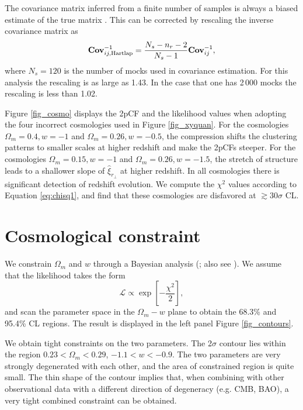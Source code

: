 \documentclass[iop]{emulateapj}
\begin{document}
The covariance matrix inferred from a finite number of samples
is always a biased estimate of the true matrix \citep{Hartlap}.
This can be corrected by rescaling the inverse covariance matrix as 
\begin{equation}
 {\bf Cov}^{-1}_{ij,\rm Hartlap} = \frac{N_s - n_{r}-2}{N_s-1} {\bf Cov}^{-1}_{ij},
\end{equation}
where $N_s=120$ is the number of mocks used in covariance estimation.
For this analysis the rescaling is as large as 1.43.
In the case that one has 2\,000 mocks the rescaling is less than 1.02.




Figure \ref{fig_cosmo} displays the 2pCF and the likelihood values when adopting 
the four incorrect cosmologies used in Figure \ref{fig_xyquan}.
For the cosmologies $\Omega_m=0.4,w=-1$ and $\Omega_m=0.26,w=-0.5$,
the compression shifts the clustering patterns to smaller scales
at higher redshift and make the 2pCFs steeper.
For the cosmologies $\Omega_m=0.15,w=-1$ and $\Omega_m=0.26,w=-1.5$,
the stretch of structure leads to a shallower slope of $\hat{\xi}_{r_\perp}$ at higher redshift.
In all cosmologies there is significant detection of redshift evolution.
We compute the $\chi^2$ values according to Equation \ref{eq:chisq1}, 
and find that these cosmologies are disfavored 
at $\gtrsim30\sigma$ CL.






\section{Cosmological constraint}


We constrain $\Omega_m$ and $w$ through a Bayesian analysis (\cite{Bayesian}; also see \cite{LB2002,Li2016}).
We assume that the likelihood takes the form
\begin{equation}\label{eq:like}
 \mathcal{L} \propto \exp\left[-\frac{\chi^2}{2}\right],
\end{equation}
and scan the parameter space in the $\Omega_m-w$ plane to obtain the 68.3\% and 95.4\% CL regions.
The result is displayed in the left panel Figure \ref{fig_contours}.


We obtain tight constraints on the two parameters.
The 2$\sigma$ contour lies within the region $0.23<\Omega_m<0.29$, $-1.1<w<-0.9$.
The two parameters are very strongly degenerated with each other,
and the area of constrained region is quite small.
The thin shape of the contour implies that, 
when combining with other observational data with a different direction of degeneracy (e.g. CMB, BAO),
a very tight combined constraint can be obtained.
\end{document}
